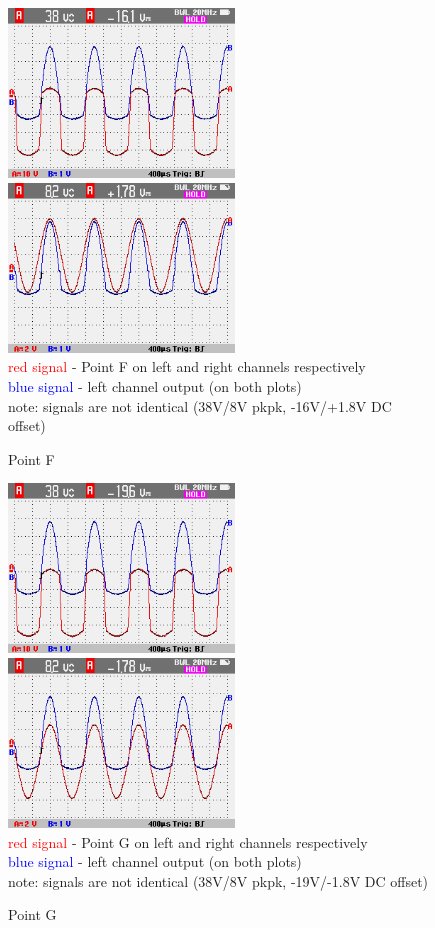 \documentclass[a4paper,twoside,notitlepage]{article}
\begin{document}
\begin{figure}[hptb!]
    \centering
    \includegraphics[width=6cm]{img_report/left_point_F.png}
    \includegraphics[width=6cm]{img_report/right_point_F.png} \\ 
    \textcolor{Red}{red signal} - Point F on left and right channels respectively \\
    \textcolor{Blue}{blue signal} - left channel output (on both plots) \\
    note: signals are not identical (38V/8V pkpk, -16V/+1.8V DC offset)
 \caption{Point F}
 \label{fig:point-F}
\end{figure}

\begin{figure}[hptb!]
    \centering
    \includegraphics[width=6cm]{img_report/left_point_G.png}
    \includegraphics[width=6cm]{img_report/right_point_G.png} \\ 
    \textcolor{Red}{red signal} - Point G on left and right channels respectively \\
    \textcolor{Blue}{blue signal} - left channel output (on both plots) \\
    note: signals are not identical (38V/8V pkpk, -19V/-1.8V DC offset)
 \caption{Point G}
 \label{fig:point-G}
\end{figure}
\end{document}

